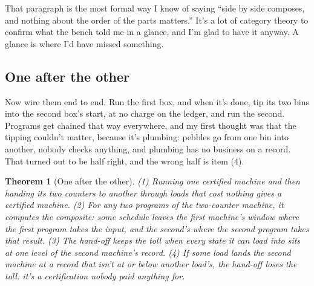 \documentclass[11pt,twoside]{article}
\theoremstyle{thielethm}
\newtheorem{theorem}{Theorem}[section]
\theoremstyle{thieledef}
\theoremstyle{thieledef}
\theoremstyle{thieledef}
\theoremstyle{thielethm}
\theoremstyle{thieleobs}
\theoremstyle{thielethm}
\begin{document}
That paragraph is the most formal way I know of saying ``side by side composes, and nothing about
the order of the parts matters.'' It's a lot of category theory to confirm what the bench told me in
a glance, and I'm glad to have it anyway. A glance is where I'd have missed something.

\subsection{One after the other}

Now wire them end to end. Run the first box, and when it's done, tip its two bins into the second
box's start, at no charge on the ledger, and run the second. Programs get chained that way everywhere, and my first
thought was that the tipping couldn't matter, because it's plumbing: pebbles go from one bin into another,
nobody checks anything, and plumbing has no business on a record. That turned out to be half right,
and the wrong half is item (4).

\begin{theorem}[One after the other]\label{thm:parts-seq}
(1) Running one certified machine and then handing its two counters to another through loads
that cost nothing gives a certified machine. (2) For any two programs of the two-counter machine, it computes the composite:
some schedule leaves the first machine's window where the first program takes the input, and the
second's where the second program takes that result. (3) The hand-off keeps the toll when every
state it can load into sits at one level of the second machine's record. (4) If some load lands
the second machine at a record that isn't at or below another load's, the hand-off loses the toll:
it's a certification nobody paid anything for.
\end{theorem}
\end{document}
